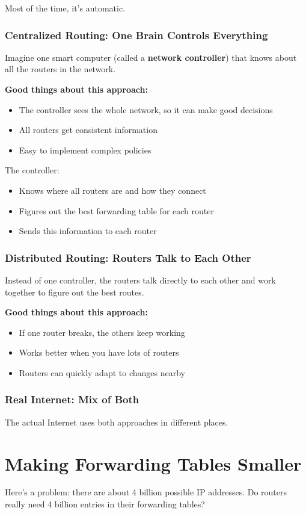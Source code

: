 \documentclass[../../compsys.tex]{subfiles}
\begin{document}
Most of the time, it's automatic.

\subsubsection{Centralized Routing: One Brain Controls Everything}
Imagine one smart computer (called a \textbf{network controller}) that knows about all the routers in the network.

\textbf{Good things about this approach:}
\begin{itemize}
    \item The controller sees the whole network, so it can make good decisions
    \item All routers get consistent information
    \item Easy to implement complex policies
\end{itemize}

The controller:
\begin{itemize}
    \item Knows where all routers are and how they connect
    \item Figures out the best forwarding table for each router
    \item Sends this information to each router
\end{itemize}

\subsubsection{Distributed Routing: Routers Talk to Each Other}
Instead of one controller, the routers talk directly to each other and work together to figure out the best routes.

\textbf{Good things about this approach:}
\begin{itemize}
    \item If one router breaks, the others keep working
    \item Works better when you have lots of routers
    \item Routers can quickly adapt to changes nearby
\end{itemize}

\subsubsection{Real Internet: Mix of Both}
The actual Internet uses both approaches in different places.

\section{Making Forwarding Tables Smaller}
Here's a problem: there are about 4 billion possible IP addresses. Do routers really need 4 billion entries in their forwarding tables? 
\end{document}
